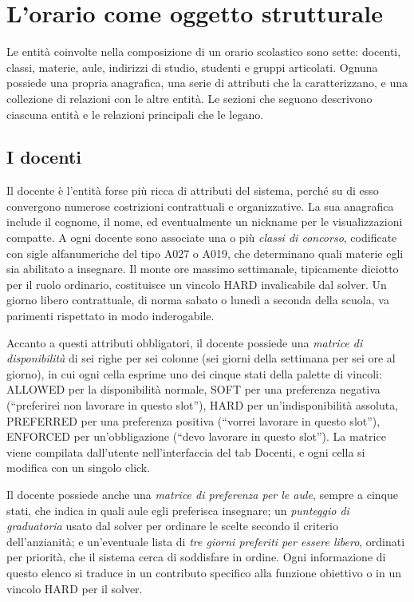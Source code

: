 \chapter{L'orario come oggetto strutturale}
\label{ch:orario_oggetto_strutturale}


Le entit\`a coinvolte nella composizione di un orario
scolastico sono sette: docenti, classi, materie, aule,
indirizzi di studio, studenti e gruppi articolati. Ognuna
possiede una propria anagrafica, una serie di attributi che
la caratterizzano, e una collezione di relazioni con le
altre entit\`a. Le sezioni che seguono descrivono ciascuna
entit\`a e le relazioni principali che le legano.

\section{I docenti}

Il docente \`e l'entit\`a forse pi\`u ricca di attributi del
sistema, perch\'e su di esso convergono numerose costrizioni
contrattuali e organizzative. La sua anagrafica include il
cognome, il nome, ed eventualmente un nickname per le
visualizzazioni compatte. A ogni docente sono associate una
o pi\`u \emph{classi di concorso}, codificate con sigle
alfanumeriche del tipo A027 o A019, che determinano quali
materie egli sia abilitato a insegnare. Il monte ore
massimo settimanale, tipicamente diciotto per il ruolo
ordinario, costituisce un vincolo HARD invalicabile dal
solver. Un giorno libero contrattuale, di norma sabato o
luned\`i a seconda della scuola, va parimenti rispettato in
modo inderogabile.

Accanto a questi attributi obbligatori, il docente possiede
una \emph{matrice di disponibilit\`a} di sei righe per sei
colonne (sei giorni della settimana per sei ore al giorno),
in cui ogni cella esprime uno dei cinque stati della palette
di vincoli: ALLOWED per la disponibilit\`a normale, SOFT per
una preferenza negativa (``preferirei non lavorare in questo
slot''), HARD per un'indisponibilit\`a assoluta, PREFERRED
per una preferenza positiva (``vorrei lavorare in questo
slot''), ENFORCED per un'obbligazione (``devo lavorare in
questo slot''). La matrice viene compilata dall'utente
nell'interfaccia del tab Docenti, e ogni cella si modifica
con un singolo click.

Il docente possiede anche una \emph{matrice di preferenza
per le aule}, sempre a cinque stati, che indica in quali
aule egli preferisca insegnare; un \emph{punteggio di
graduatoria} usato dal solver per ordinare le scelte secondo
il criterio dell'anzianit\`a; e un'eventuale lista di
\emph{tre giorni preferiti per essere libero}, ordinati per
priorit\`a, che il sistema cerca di soddisfare in ordine.
Ogni informazione di questo elenco si traduce in un
contributo specifico alla funzione obiettivo o in un
vincolo HARD per il solver.

